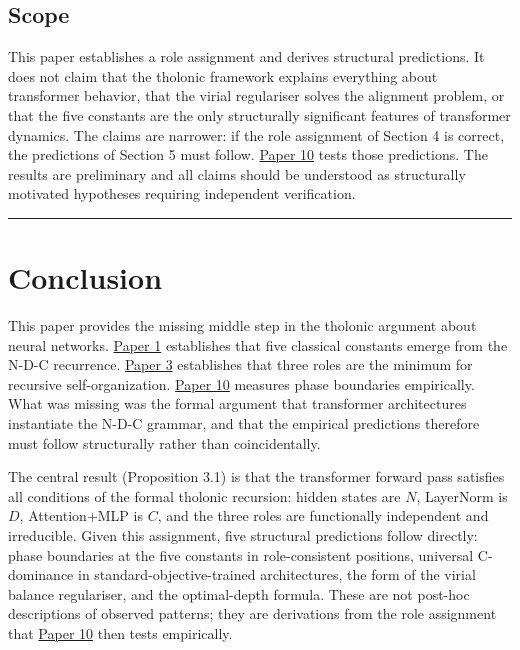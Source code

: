 \documentclass[12pt]{article}
\begin{document}
\subsection{Scope}\label{scope}

This paper establishes a role assignment and derives structural
predictions. It does not claim that the tholonic framework explains
everything about transformer behavior, that the virial regulariser
solves the alignment problem, or that the five constants are the only
structurally significant features of transformer dynamics. The claims
are narrower: if the role assignment of Section 4 is correct, the
predictions of Section 5 must follow.
\href{https://github.com/baardev/truevalue/blob/main/docnav/Research/papers/10_tholonic-neural-architecture/10_tholonic-neural-architecture.pdf}{Paper
10} tests those predictions. The results are preliminary and all claims
should be understood as structurally motivated hypotheses requiring
independent verification.

\begin{center}\rule{0.5\linewidth}{0.5pt}\end{center}

\section{Conclusion}\label{conclusion}

This paper provides the missing middle step in the tholonic argument
about neural networks.
\href{https://github.com/baardev/truevalue/blob/main/docnav/Research/papers/1_recursive-tholonic-five-constants/1_recursive-tholonic-five-constants.pdf}{Paper
1} establishes that five classical constants emerge from the N-D-C
recurrence.
\href{https://github.com/baardev/truevalue/blob/main/docnav/Research/papers/3_minimal-recursive-triadic-framework/3_minimal-recursive-triadic-framework.pdf}{Paper
3} establishes that three roles are the minimum for recursive
self-organization.
\href{https://github.com/baardev/truevalue/blob/main/docnav/Research/papers/10_tholonic-neural-architecture/10_tholonic-neural-architecture.pdf}{Paper
10} measures phase boundaries empirically. What was missing was the
formal argument that transformer architectures instantiate the N-D-C
grammar, and that the empirical predictions therefore must follow
structurally rather than coincidentally.

The central result (Proposition 3.1) is that the transformer forward
pass satisfies all conditions of the formal tholonic recursion: hidden
states are \(N\), LayerNorm is \(D\), Attention+MLP is \(C\), and the
three roles are functionally independent and irreducible. Given this
assignment, five structural predictions follow directly: phase
boundaries at the five constants in role-consistent positions, universal
C-dominance in standard-objective-trained architectures, the form of the
virial balance regulariser, and the optimal-depth formula. These are not
post-hoc descriptions of observed patterns; they are derivations from
the role assignment that
\href{https://github.com/baardev/truevalue/blob/main/docnav/Research/papers/10_tholonic-neural-architecture/10_tholonic-neural-architecture.pdf}{Paper
10} then tests empirically.
\end{document}
